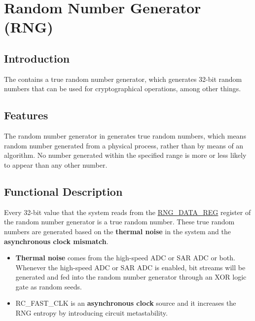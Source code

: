 \documentclass[main\_\_EN.tex]{subfiles}
\begin{document}

\ifglobal
\else
    {\let\clearpage\relax \listoftodos}
    \tableofcontents
\fi



\hypertarget{rng}{}
\chapter{Random Number Generator (RNG)}\label{mod:rng}

\section{Introduction}

The \chipname{} contains a true random number generator, which generates 32-bit random numbers that can be used for cryptographical operations, among other things.

\section{Features}

The random number generator in \chipname{} generates true random numbers, which means random number generated from a physical process, rather than by means of an algorithm. No number generated within the specified range is more or less likely to appear than any other number.

\section{Functional Description}\label{sec:rng-func-descr}

Every 32-bit value that the system reads from the \hyperref[regdesc:RNGDATAREG]{RNG\_DATA\_REG} register of the random number generator is a true random number. These true random numbers are generated based on the \textbf{thermal noise} in the system and the \textbf{asynchronous clock mismatch}.

\begin{itemize}
    \item \textbf{Thermal noise} comes from the high-speed ADC or SAR ADC or both. Whenever the high-speed ADC or SAR ADC is enabled, bit streams will be generated and fed into the random number generator through an XOR logic gate as random seeds.
    \item RC\_FAST\_CLK is an \textbf{asynchronous clock} source and it increases the RNG entropy by introducing circuit metastability.
\end{itemize}
 
\end{document}
